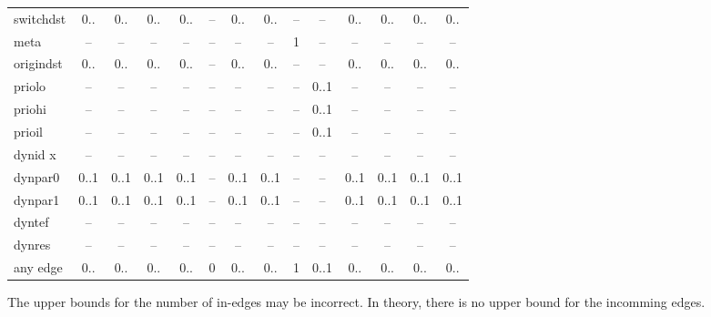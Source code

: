 \begin{table}
\begin{adjustwidth}{-25mm}{}
\begin{tabular}[t]{|l|c|c|c|c|c|c|c|c|c|c|c|c|c|}
switchdst        & 0..        & 0..             & 0..        & 0..        & --           & 0..        & 0..         & --        & --         & 0..              & 0..         & 0..        & 0..      \\
meta             & --         & --              & --         & --         & --           & --         & --          & 1         & --         & --               & --          & --         & --       \\
origindst        & 0..        & 0..             & 0..        & 0..        & --           & 0..        & 0..         & --        & --         & 0..              & 0..         & 0..        & 0..      \\
priolo           & --         & --              & --         & --         & --           & --         & --          & --        & 0..1       & --               & --          & --         & --       \\
priohi           & --         & --              & --         & --         & --           & --         & --          & --        & 0..1       & --               & --          & --         & --       \\
prioil           & --         & --              & --         & --         & --           & --         & --          & --        & 0..1       & --               & --          & --         & --       \\
dynid x          & --         & --              & --         & --         & --           & --         & --          & --        & --         & --               & --          & --         & --       \\
dynpar0          & 0..1       & 0..1            & 0..1       & 0..1       & --           & 0..1       & 0..1        & --        & --         & 0..1             & 0..1        & 0..1       & 0..1     \\
dynpar1          & 0..1       & 0..1            & 0..1       & 0..1       & --           & 0..1       & 0..1        & --        & --         & 0..1             & 0..1        & 0..1       & 0..1     \\
dyntef           & --         & --              & --         & --         & --           & --         & --          & --        & --         & --               & --          & --         & --       \\
dynres           & --         & --              & --         & --         & --           & --         & --          & --        & --         & --               & --          & --         & --       \\
any edge         & 0..        & 0..             & 0..        & 0..        & 0            & 0..        & 0..         & 1         & 0..1       & 0..              & 0..         & 0..        & 0..      \\
\hline
\end{tabular}
\end{adjustwidth}
The upper bounds for the number of in-edges may be incorrect. In theory, there is no upper bound for the incomming edges.


\end{table}
